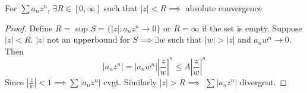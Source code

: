 \vspace*{5pt}
\begin{theorem} For $\sum a_n z^n$, $\exists R \in [0,\infty]$ such that $|z| < R \implies $ absolute convergence 
\end{theorem}
\begin{proof}
Define $R =$ sup $S = \{|z| : a_nz^n \to 0\}$	 or $R = \infty$ if the set is empty. Suppose $|z| < R$. $|z|$ not an upperbound for $S \implies \exists w$ such that $|w| > |z|$ and $a_nw^n \to 0.$ Then \[|a_nz^n| = |a_nw^n|\left|\frac{z}{w}\right|^n \leq A\left|\frac{z}{w}\right|^n\] Since $\left|\frac{z}{w}\right| < 1 \implies \sum|a_nz^n|$ cvgt. Similarly $|z| >R  \implies$ $\sum |a_nz^n|$ divergent. 
\end{proof}



\pagebreak